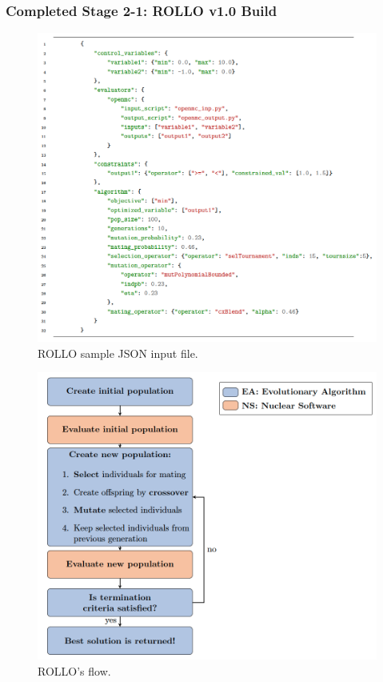 \begin{frame}
    \frametitle{Completed Stage 2-1: ROLLO v1.0 Build}
    \begin{minipage}[c]{0.6\textwidth}
    \begin{figure}
        \centering
        \includegraphics[width=\linewidth]{figures/rollo-json-input.png} 
        \caption{ROLLO sample JSON input file.}
    \end{figure}
\end{minipage}\hfill
\begin{minipage}[c]{0.4\textwidth}
    \centering
    \begin{figure}
        \includegraphics[width=\linewidth]{figures/rollo-flow.png} 
        \caption{ROLLO's flow.}
    \end{figure}
\end{minipage}
\end{frame}

